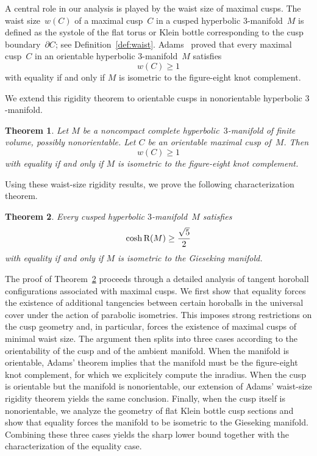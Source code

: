 \documentclass[11pt,reqno]{amsart}
\newtheorem{theorem}{Theorem}[section]
\theoremstyle{definition}
\numberwithin{equation}{section}
\newcommand\RR{{\rm R}}
\numberwithin{equation}{section}
\begin{document}
\medskip

A central role in our analysis is played by the waist size of maximal cusps.
The waist size~$w(C)$ of a maximal cusp~$C$ in a cusped hyperbolic $3$-manifold~$M$ is defined as the systole of the flat torus or Klein bottle corresponding to the cusp boundary~$\partial C$; see Definition~\ref{def:waist}.
Adams~\cite{adams_waist} proved that every maximal cusp~$C$ in an orientable hyperbolic $3$-manifold~$M$ satisfies
\[
w(C) \geq 1
\]
with equality if and only if $M$ is isometric to the figure-eight knot complement.

\medskip

We extend this rigidity theorem to orientable cusps in nonorientable hyperbolic $3$-manifold.

\begin{theorem} 
Let $M$ be a noncompact complete hyperbolic~$3$-manifold of finite volume, possibly nonorientable.
Let $C$ be an orientable maximal cusp of~$M$.
Then 
\[
w(C) \geq 1
\]
with equality if and only if $M$ is isometric to the figure-eight knot complement.
\end{theorem}

Using these waist-size rigidity results, we prove the following characterization theorem.

\begin{theorem} \label{theo:carac}
Every cusped hyperbolic $3$-manifold~$M$ satisfies
\[
\cosh \RR(M) \geq \frac{\sqrt{5}}{2}
\]
with equality if and only if $M$ is isometric to the Gieseking manifold.
\end{theorem}


The proof of Theorem~\ref{theo:carac} proceeds through a detailed analysis of tangent horoball configurations associated with maximal cusps. 
We first show that equality forces the existence of additional tangencies between certain horoballs in the universal cover under the action of parabolic isometries. 
This imposes strong restrictions on the cusp geometry and, in particular, forces the existence of maximal cusps of minimal waist size.
The argument then splits into three cases according to the orientability of the cusp and of the ambient manifold. 
When the manifold is orientable, Adams' theorem implies that the manifold must be the figure-eight knot complement, for which we explicitely compute the inradius.
When the cusp is orientable but the manifold is nonorientable, our extension of Adams' waist-size rigidity theorem yields the same conclusion.
Finally, when the cusp itself is nonorientable, we analyze the geometry of flat Klein bottle cusp sections and show that equality forces the manifold to be isometric to the Gieseking manifold. 
Combining these three cases yields the sharp lower bound together with the characterization of the equality case. 
\end{document}
